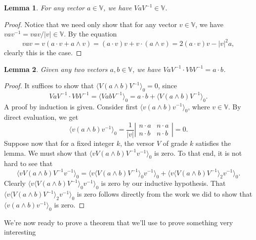 \documentclass[12pt]{article}
\newcommand{\V}{\mathbb{V}}
\newtheorem{lemma}{Lemma}[section]
\begin{document}
\begin{lemma}\label{lma_vector_invariance}
For any vector $a\in\V$, we have $VaV^{-1}\in\V$.
\end{lemma}
\begin{proof}
Notice that we need only show that for any vector $v\in\V$, we have $vav^{-1}=vav/|v|\in\V$.
By the equation
\begin{equation*}
vav = v(a\cdot v + a\wedge v) = (a\cdot v)v + v\cdot(a\wedge v)  = 2(a\cdot v)v - |v|^2a,
\end{equation*}
clearly this is the case.
\end{proof}
\begin{lemma}\label{lma_inner_prod_preserve}
Given any two vectors $a,b\in\V$, we have $VaV^{-1}\cdot VbV^{-1}=a\cdot b$.
\end{lemma}
\begin{proof}
It suffices to show that $\langle V(a\wedge b)V^{-1}\rangle_0=0$, since
\begin{equation*}
VaV^{-1}\cdot VbV^{-1} = \langle VabV^{-1}\rangle_0 = a\cdot b + \langle V(a\wedge b)V^{-1}\rangle_0.
\end{equation*}
A proof by induction is given.  Consider first $\langle v(a\wedge b)v^{-1}\rangle_0$, where $v\in\V$.
By direct evaluation, we get
\begin{equation*}
\langle v(a\wedge b)v^{-1}\rangle_0 = \frac{1}{|v|}
\left|\begin{array}{cc} n\cdot a & n\cdot a\\ n\cdot b & n\cdot b\end{array}\right| = 0.
\end{equation*}
Suppose now that for a fixed integer $k$, the versor $V$
of grade $k$ satisfies the lemma.  We must show that $\langle vV(a\wedge b)V^{-1}v^{-1}\rangle_0$ is zero.
To that end, it is not hard to see that
\begin{equation*}
\langle vV(a\wedge b)V^{-1}v^{-1}\rangle_0 =
\langle v\langle V(a\wedge b)V^{-1}\rangle_0 v^{-1}\rangle_0 +
\langle v\langle V(a\wedge b)V^{-1}\rangle_2 v^{-1}\rangle_0.
\end{equation*}
Clearly $\langle v\langle V(a\wedge b)V^{-1}\rangle_0 v^{-1}\rangle_0$ is zero by our inductive hypothesis.
That $\langle v\langle V(a\wedge b)V^{-1}\rangle_2 v^{-1}\rangle_0$ is zero follows directly from
the work we did to show that $\langle v(a\wedge b)v^{-1}\rangle_0$ is zero.
\end{proof}
We're now ready to prove a theorem that we'll use to prove something very interesting
\end{document}
